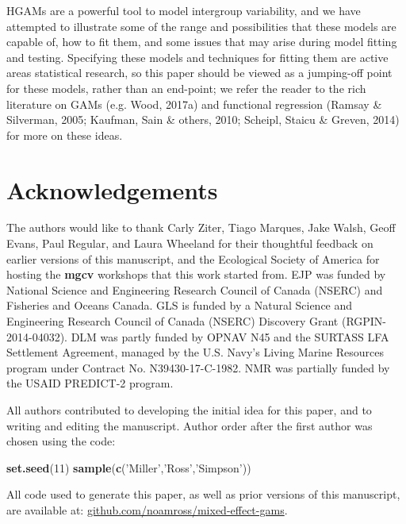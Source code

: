 \documentclass[12pt]{article}
\newenvironment{Shaded}{\begin{snugshade}}{\end{snugshade}}
\newcommand{\KeywordTok}[1]{\textcolor[rgb]{0.13,0.29,0.53}{\textbf{#1}}}
\newcommand{\DecValTok}[1]{\textcolor[rgb]{0.00,0.00,0.81}{#1}}
\newcommand{\StringTok}[1]{\textcolor[rgb]{0.31,0.60,0.02}{#1}}
\newcommand{\NormalTok}[1]{#1}
\begin{document}
HGAMs are a powerful tool to model intergroup variability, and we have
attempted to illustrate some of the range and possibilities that these
models are capable of, how to fit them, and some issues that may arise
during model fitting and testing. Specifying these models and techniques
for fitting them are active areas statistical research, so this paper
should be viewed as a jumping-off point for these models, rather than an
end-point; we refer the reader to the rich literature on GAMs (e.g.
Wood, 2017a) and functional regression (Ramsay \& Silverman, 2005;
Kaufman, Sain \& others, 2010; Scheipl, Staicu \& Greven, 2014) for more
on these ideas.

\section{Acknowledgements}\label{acknowledgements}

The authors would like to thank Carly Ziter, Tiago Marques, Jake Walsh,
Geoff Evans, Paul Regular, and Laura Wheeland for their thoughtful
feedback on earlier versions of this manuscript, and the Ecological
Society of America for hosting the \textbf{mgcv} workshops that this
work started from. EJP was funded by National Science and Engineering
Research Council of Canada (NSERC) and Fisheries and Oceans Canada. GLS
is funded by a Natural Science and Engineering Research Council of
Canada (NSERC) Discovery Grant (RGPIN-2014-04032). DLM was partly funded
by OPNAV N45 and the SURTASS LFA Settlement Agreement, managed by the
U.S. Navy's Living Marine Resources program under Contract No.
N39430-17-C-1982. NMR was partially funded by the USAID PREDICT-2
program.

All authors contributed to developing the initial idea for this paper,
and to writing and editing the manuscript. Author order after the first
author was chosen using the code:

\begin{Shaded}
\begin{Highlighting}[]
\KeywordTok{set.seed}\NormalTok{(}\DecValTok{11}\NormalTok{)}
\KeywordTok{sample}\NormalTok{(}\KeywordTok{c}\NormalTok{(}\StringTok{'Miller'}\NormalTok{,}\StringTok{'Ross'}\NormalTok{,}\StringTok{'Simpson'}\NormalTok{))}
\end{Highlighting}
\end{Shaded}

All code used to generate this paper, as well as prior versions of this
manuscript, are available at:
\href{https://github.com/noamross/mixed-effect-gams}{github.com/noamross/mixed-effect-gams}.
\end{document}
